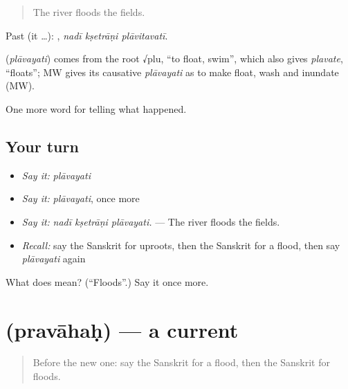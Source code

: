 \begin{quote}
The river floods the fields.
\end{quote}

Past (it …):   , \emph{nadī kṣetrāṇi plāvitavatī}.

\begin{cousinweb}
\textbf{} (\emph{plāvayati}) comes from the root √plu, \textquotedblleft{}to float, swim\textquotedblright{}, which also gives \emph{plavate}, \textquotedblleft{}floats\textquotedblright{}; MW gives its causative \emph{plāvayati} as to make float, wash and inundate (MW).
\end{cousinweb}

\begin{grammarlens}[title={What you've built}]
One more word for telling what happened.
\end{grammarlens}

\subsection*{Your turn}
\begin{itemize}
\raggedright
  \item \emph{Say it:} \emph{plāvayati}
  \item \emph{Say it:} \emph{plāvayati}, once more
  \item \emph{Say it:} \emph{nadī kṣetrāṇi plāvayati.} — The river floods the fields.
  \item \emph{Recall:} say the Sanskrit for uproots, then the Sanskrit for a flood, then say \emph{plāvayati} again
\end{itemize}

\begin{tcolorbox}[breakable,colback=teal!4,colframe=teal!35!black,title={Before you move on}]
What does  mean? (\textquotedblleft{}Floods\textquotedblright{}.) Say it once more.
\end{tcolorbox}
\section[\texorpdfstring{\sk{प्रवाहः} (pravāhaḥ)}{प्रवाहः (pravāhaḥ)}]{ (pravāhaḥ) — a current}

\label{lesson:SA-C302-pravahah}



\begin{quote}
Before the new one: say the Sanskrit for a flood, then the Sanskrit for floods.
\end{quote}

